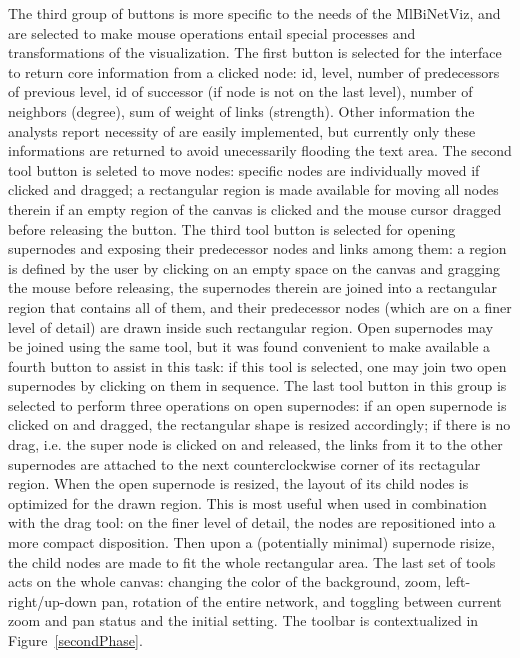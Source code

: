 \documentclass[runningheads]{llncs}
\begin{document}
The third group of buttons is more specific to the needs of the MlBiNetViz, and
are selected to make mouse operations entail special processes and transformations of the visualization.
The first button is selected for the interface to return core information from a clicked node:
id, level, number of predecessors of previous level, id of successor (if node is not on the last level),
number of neighbors (degree), sum of weight of links (strength).
Other information the analysts report necessity of are easily implemented, but currently only these informations
are returned to avoid unecessarily flooding the text area.
The second tool button is seleted to move nodes: specific nodes are individually moved if clicked and dragged;
a rectangular region is made available for moving all nodes therein if an empty region of the canvas
is clicked and the mouse cursor dragged before releasing the button.
The third tool button is selected for opening supernodes and exposing their predecessor nodes and links among them:
a region is defined by the user by clicking on an empty space on the canvas and gragging the mouse before releasing,
the supernodes therein are joined into a rectangular region that contains all of them,
and their predecessor nodes (which are on a finer level of detail) are drawn inside such rectangular region.
Open supernodes may be joined using the same tool, but it was found convenient to make available a
fourth button to assist in this task: if this tool is selected, one may join two open supernodes by
clicking on them in sequence.
The last tool button in this group is selected to perform three operations on open supernodes:
if an open supernode is clicked on and dragged, the rectangular shape is resized accordingly;
if there is no drag, i.e. the super node is clicked on and released, the links from it to the other
supernodes are attached to the next counterclockwise corner of its rectagular region.
When the open supernode is resized, the layout of its child nodes is optimized for the drawn region.
This is most useful when used in combination with the drag tool:
on the finer level of detail, the nodes are repositioned into a more compact disposition.
Then upon a (potentially minimal) supernode
risize, the child nodes are made to fit the whole rectangular area.
The last set of tools acts on the whole canvas:
changing the color of the background, zoom, left-right/up-down pan,
rotation of the entire network,
and toggling between current zoom and pan status and the initial setting.
The toolbar is contextualized in Figure~\ref{secondPhase}.
\end{document}
